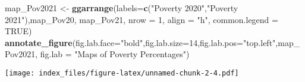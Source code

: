 \documentclass[
]{article}
\newenvironment{Shaded}{\begin{snugshade}}{\end{snugshade}}
\newcommand{\AttributeTok}[1]{\textcolor[rgb]{0.13,0.29,0.53}{#1}}
\newcommand{\ConstantTok}[1]{\textcolor[rgb]{0.56,0.35,0.01}{#1}}
\newcommand{\DecValTok}[1]{\textcolor[rgb]{0.00,0.00,0.81}{#1}}
\newcommand{\FunctionTok}[1]{\textcolor[rgb]{0.13,0.29,0.53}{\textbf{#1}}}
\newcommand{\NormalTok}[1]{#1}
\newcommand{\OtherTok}[1]{\textcolor[rgb]{0.56,0.35,0.01}{#1}}
\newcommand{\StringTok}[1]{\textcolor[rgb]{0.31,0.60,0.02}{#1}}
\begin{document}
\begin{Shaded}
\begin{Highlighting}[]
\NormalTok{map\_Pov2021 }\OtherTok{\textless{}{-}} \FunctionTok{ggarrange}\NormalTok{(}\AttributeTok{labels=}\FunctionTok{c}\NormalTok{(}\StringTok{"Poverty 2020"}\NormalTok{,}\StringTok{"Poverty 2021"}\NormalTok{),map\_Pov20, map\_Pov21, }\AttributeTok{nrow =} \DecValTok{1}\NormalTok{, }\AttributeTok{align =} \StringTok{"h"}\NormalTok{, }\AttributeTok{common.legend =} \ConstantTok{TRUE}\NormalTok{)}
\FunctionTok{annotate\_figure}\NormalTok{(}\AttributeTok{fig.lab.face=}\StringTok{"bold"}\NormalTok{,}\AttributeTok{fig.lab.size=}\DecValTok{14}\NormalTok{,}\AttributeTok{fig.lab.pos=}\StringTok{"top.left"}\NormalTok{,map\_Pov2021, }\AttributeTok{fig.lab =} \StringTok{"Maps of Poverty Percentages"}\NormalTok{)}
\end{Highlighting}
\end{Shaded}

\texttt{[image: index\_files/figure-latex/unnamed-chunk-2-4.pdf]}
\end{document}
